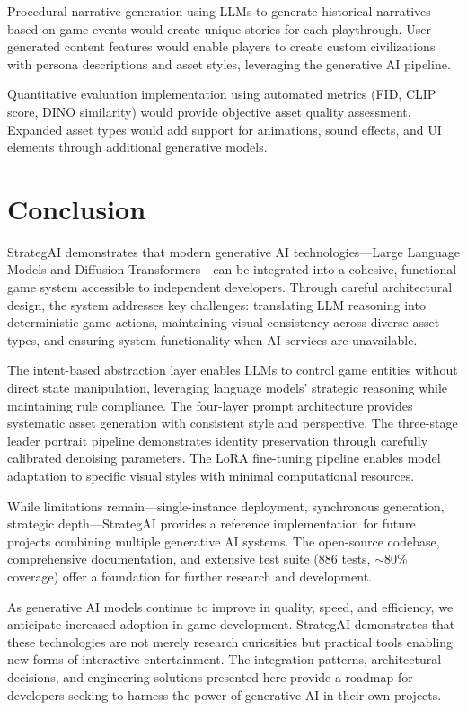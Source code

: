 \documentclass[conference]{IEEEtran}
\begin{document}
Procedural narrative generation using LLMs to generate historical narratives based on game events would create unique stories for each playthrough. User-generated content features would enable players to create custom civilizations with persona descriptions and asset styles, leveraging the generative AI pipeline.

Quantitative evaluation implementation using automated metrics (FID, CLIP score, DINO similarity) would provide objective asset quality assessment. Expanded asset types would add support for animations, sound effects, and UI elements through additional generative models.

\section{Conclusion}
\label{sec:conclusion}

StrategAI demonstrates that modern generative AI technologies---Large Language Models and Diffusion Transformers---can be integrated into a cohesive, functional game system accessible to independent developers. Through careful architectural design, the system addresses key challenges: translating LLM reasoning into deterministic game actions, maintaining visual consistency across diverse asset types, and ensuring system functionality when AI services are unavailable.

The intent-based abstraction layer enables LLMs to control game entities without direct state manipulation, leveraging language models' strategic reasoning while maintaining rule compliance. The four-layer prompt architecture provides systematic asset generation with consistent style and perspective. The three-stage leader portrait pipeline demonstrates identity preservation through carefully calibrated denoising parameters. The LoRA fine-tuning pipeline enables model adaptation to specific visual styles with minimal computational resources.

While limitations remain---single-instance deployment, synchronous generation, strategic depth---StrategAI provides a reference implementation for future projects combining multiple generative AI systems. The open-source codebase, comprehensive documentation, and extensive test suite (886 tests, $\sim$80\% coverage) offer a foundation for further research and development.

As generative AI models continue to improve in quality, speed, and efficiency, we anticipate increased adoption in game development. StrategAI demonstrates that these technologies are not merely research curiosities but practical tools enabling new forms of interactive entertainment. The integration patterns, architectural decisions, and engineering solutions presented here provide a roadmap for developers seeking to harness the power of generative AI in their own projects.
\end{document}
